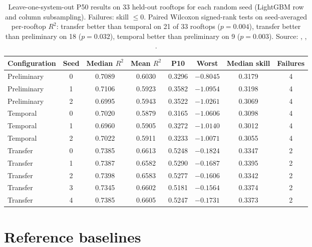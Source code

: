 \begin{table}[H]
\centering
\caption{Leave-one-system-out P50 results on 33 held-out rooftops for each random seed (LightGBM row and column subsampling). Failures: skill $\le 0$. Paired Wilcoxon signed-rank tests on seed-averaged per-rooftop $R^2$: transfer better than temporal on 21 of 33 rooftops ($p = 0.004$), transfer better than preliminary on 18 ($p = 0.032$), temporal better than preliminary on 9 ($p = 0.003$). Source: , , .}
\label{tab:s-seeds}
\small
\begin{tabularx}{\textwidth}{@{}X c c c c c c c@{}}
\toprule
Configuration & Seed & Median $R^2$ & Mean $R^2$ & P10 & Worst & Median skill & Failures \\
\midrule
Preliminary & 0 & 0.7089 & 0.6030 & 0.3296 & $-0.8045$ & 0.3179 & 4 \\
Preliminary & 1 & 0.7106 & 0.5923 & 0.3582 & $-1.0954$ & 0.3198 & 4 \\
Preliminary & 2 & 0.6995 & 0.5943 & 0.3522 & $-1.0261$ & 0.3069 & 4 \\
Temporal & 0 & 0.7020 & 0.5879 & 0.3165 & $-1.0606$ & 0.3098 & 4 \\
Temporal & 1 & 0.6960 & 0.5905 & 0.3272 & $-1.0140$ & 0.3012 & 4 \\
Temporal & 2 & 0.7022 & 0.5911 & 0.3233 & $-1.0071$ & 0.3055 & 4 \\
Transfer & 0 & 0.7385 & 0.6613 & 0.5248 & $-0.1824$ & 0.3347 & 2 \\
Transfer & 1 & 0.7387 & 0.6582 & 0.5290 & $-0.1687$ & 0.3395 & 2 \\
Transfer & 2 & 0.7398 & 0.6583 & 0.5277 & $-0.1606$ & 0.3342 & 2 \\
Transfer & 3 & 0.7345 & 0.6602 & 0.5181 & $-0.1564$ & 0.3374 & 2 \\
Transfer & 4 & 0.7385 & 0.6605 & 0.5247 & $-0.1731$ & 0.3373 & 2 \\
\bottomrule
\end{tabularx}
\end{table}

\section{Reference baselines}
\label{sec:s-baselines}

